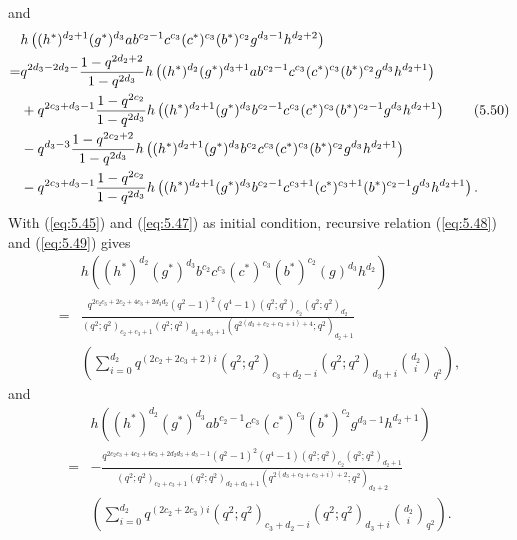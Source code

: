 \documentclass[table,a4paper,reqno]{amsart}
\numberwithin{equation}{section}
\theoremstyle{definition}
\begin{document}
and
\begin{align}\label{eq:5.49}\stepcounter{equation}
        &h\left((h^*)^{d_2+1}(g^*)^{d_3}ab^{c_2-1}c^{c_3}(c^*)^{c_3}(b^*)^{c_2}g^{d_3-1}h^{d_2+2}\right)\notag\\
        =&q^{2d_3-2d_2-}\frac{1-q^{2d_2+2}}{1-q^{2d_3}}h\left((h^*)^{d_2}(g^*)^{d_3+1}ab^{c_2-1}c^{c_3}(c^*)^{c_3}(b^*)^{c_2}g^{d_3}h^{d_2+1}\right)\notag\\
        &+q^{2c_3+d_3-1}\frac{1-q^{2c_2}}{1-q^{2d_3}}h\left((h^*)^{d_2+1}(g^*)^{d_3}b^{c_2-1}c^{c_3}(c^*)^{c_3}(b^*)^{c_2-1}g^{d_3}h^{d_2+1}\right)\tag{5.50}\\
        &-q^{d_3-3}\frac{1-q^{2c_2+2}}{1-q^{2d_3}}h\left((h^*)^{d_2+1}(g^*)^{d_3}b^{c_2}c^{c_3}(c^*)^{c_3}(b^*)^{c_2}g^{d_3}h^{d_2+1}\right)\notag\\
        &-q^{2c_3+d_3-1}\frac{1-q^{2c_2}}{1-q^{2d_3}}h\left((h^*)^{d_2+1}(g^*)^{d_3}b^{c_2-1}c^{c_3+1}(c^*)^{c_3+1}(b^*)^{c_2-1}g^{d_3}h^{d_2+1}\right).\notag
\end{align}
With (\ref{eq:5.45}) and (\ref{eq:5.47}) as initial condition, recursive relation (\ref{eq:5.48}) and (\ref{eq:5.49}) gives
\begin{equation}\label{eq:5.50}
    \begin{split}
        &h\left((h^*)^{d_2}(g^*)^{d_3}b^{c_2}c^{c_3}(c^*)^{c_3}(b^*)^{c_2}(g)^{d_3}h^{d_2}\right)\\
        =&\frac{q^{2c_2c_3+2c_2+4c_3+2d_3d_2}(q^2-1)^2(q^4-1)(q^2;q^2)_{c_2}(q^2;q^2)_{d_2}}{(q^2;q^2)_{c_2+c_3+1}(q^2;q^2)_{d_2+d_3+1}(q^{2(d_3+c_2+c_3+i)+4};q^2)_{d_2+1}}\\
        &\left(\sum_{i=0}^{d_2}q^{(2c_2+2c_3+2)i}(q^2;q^2)_{c_3+d_2-i}(q^2;q^2)_{d_3+i}{d_2\choose i}_{q^2}\right),
    \end{split}
\end{equation}
and
\begin{equation}\label{eq:5.51}
    \begin{split}
        &h\left((h^*)^{d_2}(g^*)^{d_3}ab^{c_2-1}c^{c_3}(c^*)^{c_3}(b^*)^{c_2}g^{d_3-1}h^{d_2+1}\right)\\
        =&-\frac{q^{2c_2c_3+4c_2+6c_3+2d_2d_3+d_3-1}(q^2-1)^2(q^4-1)(q^2;q^2)_{c_2}(q^2;q^2)_{d_2+1}}{(q^2;q^2)_{c_2+c_3+1}(q^2;q^2)_{d_2+d_3+1}(q^{2(d_3+c_2+c_3+i)+2};q^2)_{d_2+2}}\\
        &\left(\sum_{i=0}^{d_2}q^{(2c_2+2c_3)i}(q^2;q^2)_{c_3+d_2-i}(q^2;q^2)_{d_3+i}{d_2\choose i}_{q^2}\right).
    \end{split}
\end{equation}
\end{document}
